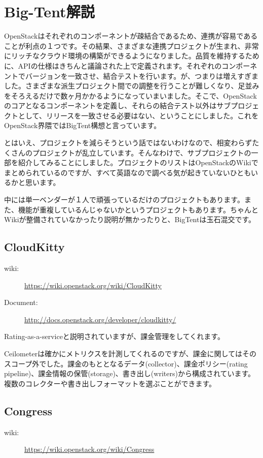 \chapter{Big-Tent解説}
OpenStackはそれぞれのコンポーネントが疎結合であるため、連携が容易であることが利点の１つです。その結果、さまざまな連携プロジェクトが生まれ、非常にリッチなクラウド環境の構築ができるようになりました。品質を維持するために、APIの仕様はきちんと議論された上で定義されます。それぞれのコンポーネントでバージョンを一致させ、結合テストを行います。が、つまりは増えすぎました。さまざまな派生プロジェクト間での調整を行うことが難しくなり、足並みをそろえるだけで数ヶ月かかるようになっていまいました。そこで、OpenStackのコアとなるコンポーネントを定義し、それらの結合テスト以外はサブプロジェクトとして、リリースを一致させる必要はない、ということにしました。これをOpenStack界隈ではBigTent構想と言っています。

とはいえ、プロジェクトを減らそうという話ではないわけなので、相変わらずたくさんのプロジェクトが乱立しています。そんなわけで、サブプロジェクトの一部を紹介してみることにしました。プロジェクトのリストはOpenStackのWikiでまとめられているのですが、すべて英語なので調べる気が起きていないひともいるかと思います。

中には単一ベンダーが１人で頑張っているだけのプロジェクトもあります。また、機能が重複しているんじゃないかというプロジェクトもあります。ちゃんとWikiが整備されていなかったり説明が無かったりと、BigTentは玉石混交です。

\section{CloudKitty}
\begin{description}
	\item[wiki:] \url{https://wiki.openstack.org/wiki/CloudKitty}
	\item[Document:] \url{http://docs.openstack.org/developer/cloudkitty/}
\end{description}
Rating-as-a-serviceと説明されていますが、課金管理をしてくれます。

Ceilometerは確かにメトリクスを計測してくれるのですが、課金に関してはそのスコープ外でした。課金のもととなるデータ(collector)、課金ポリシー(rating pipeline)、課金情報の保管(storage)、書き出し(writers)から構成されています。複数のコレクターや書き出しフォーマットを選ぶことができます。

\section{Congress}
\begin{description}
	\item[wiki:] \url{https://wiki.openstack.org/wiki/Congress}
\end{description}

